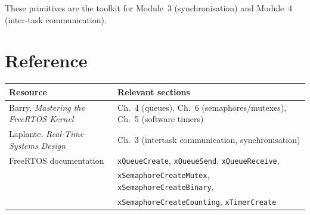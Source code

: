 \documentclass[11pt, a4paper]{article}
\newcommand{\api}[1]{\texttt{\small #1}}
\begin{document}
\medskip
These primitives are the toolkit for Module~3 (synchronisation) and Module~4
(inter-task communication).

\section{Reference}

\begin{tabular}{@{} p{6cm} p{7.5cm} @{}}
  \toprule
  \textbf{Resource} & \textbf{Relevant sections} \\
  \midrule
  Barry, \textit{Mastering the FreeRTOS Kernel} &
    Ch.~4 (queues), Ch.~6 (semaphores/mutexes), Ch.~5 (software timers) \\
  Laplante, \textit{Real-Time Systems Design} &
    Ch.~3 (intertask communication, synchronisation) \\
  FreeRTOS documentation &
    \api{xQueueCreate}, \api{xQueueSend}, \api{xQueueReceive},\\
    & \api{xSemaphoreCreateMutex}, \api{xSemaphoreCreateBinary},\\
    & \api{xSemaphoreCreateCounting}, \api{xTimerCreate} \\
  \bottomrule
\end{tabular}
\end{document}
